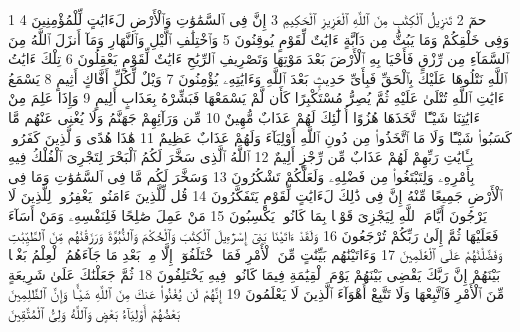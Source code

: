 {\tiny\colorbox{cl_aya}{1}} حمٓ
{\tiny\colorbox{cl_aya}{2}} تَنزِيلُ ٱلْكِتَٰبِ مِنَ ٱللَّهِ ٱلْعَزِيزِ ٱلْحَكِيمِ
{\tiny\colorbox{cl_aya}{3}} إِنَّ فِى ٱلسَّمَٰوَٰتِ وَٱلْأَرْضِ لَءَايَٰتٍ لِّلْمُؤْمِنِينَ
{\tiny\colorbox{cl_aya}{4}} وَفِى خَلْقِكُمْ وَمَا يَبُثُّ مِن دَآبَّةٍ ءَايَٰتٌ لِّقَوْمٍ يُوقِنُونَ
{\tiny\colorbox{cl_aya}{5}} وَٱخْتِلَٰفِ ٱلَّيْلِ وَٱلنَّهَارِ وَمَآ أَنزَلَ ٱللَّهُ مِنَ ٱلسَّمَآءِ مِن رِّزْقٍ فَأَحْيَا بِهِ ٱلْأَرْضَ بَعْدَ مَوْتِهَا وَتَصْرِيفِ ٱلرِّيَٰحِ ءَايَٰتٌ لِّقَوْمٍ يَعْقِلُونَ
{\tiny\colorbox{cl_aya}{6}} تِلْكَ ءَايَٰتُ ٱللَّهِ نَتْلُوهَا عَلَيْكَ بِٱلْحَقِّ فَبِأَىِّ حَدِيثٍۭ بَعْدَ ٱللَّهِ وَءَايَٰتِهِۦ يُؤْمِنُونَ
{\tiny\colorbox{cl_aya}{7}} وَيْلٌ لِّكُلِّ أَفَّاكٍ أَثِيمٍ
{\tiny\colorbox{cl_aya}{8}} يَسْمَعُ ءَايَٰتِ ٱللَّهِ تُتْلَىٰ عَلَيْهِ ثُمَّ يُصِرُّ مُسْتَكْبِرًا كَأَن لَّمْ يَسْمَعْهَا فَبَشِّرْهُ بِعَذَابٍ أَلِيمٍ
{\tiny\colorbox{cl_aya}{9}} وَإِذَا عَلِمَ مِنْ ءَايَٰتِنَا شَيْـًٔا ٱتَّخَذَهَا هُزُوًا أُو۟لَٰٓئِكَ لَهُمْ عَذَابٌ مُّهِينٌ
{\tiny\colorbox{cl_aya}{10}} مِّن وَرَآئِهِمْ جَهَنَّمُ وَلَا يُغْنِى عَنْهُم مَّا كَسَبُوا۟ شَيْـًٔا وَلَا مَا ٱتَّخَذُوا۟ مِن دُونِ ٱللَّهِ أَوْلِيَآءَ وَلَهُمْ عَذَابٌ عَظِيمٌ
{\tiny\colorbox{cl_aya}{11}} هَٰذَا هُدًى وَٱلَّذِينَ كَفَرُوا۟ بِـَٔايَٰتِ رَبِّهِمْ لَهُمْ عَذَابٌ مِّن رِّجْزٍ أَلِيمٌ
{\tiny\colorbox{cl_aya}{12}} ٱللَّهُ ٱلَّذِى سَخَّرَ لَكُمُ ٱلْبَحْرَ لِتَجْرِىَ ٱلْفُلْكُ فِيهِ بِأَمْرِهِۦ وَلِتَبْتَغُوا۟ مِن فَضْلِهِۦ وَلَعَلَّكُمْ تَشْكُرُونَ
{\tiny\colorbox{cl_aya}{13}} وَسَخَّرَ لَكُم مَّا فِى ٱلسَّمَٰوَٰتِ وَمَا فِى ٱلْأَرْضِ جَمِيعًا مِّنْهُ إِنَّ فِى ذَٰلِكَ لَءَايَٰتٍ لِّقَوْمٍ يَتَفَكَّرُونَ
{\tiny\colorbox{cl_aya}{14}} قُل لِّلَّذِينَ ءَامَنُوا۟ يَغْفِرُوا۟ لِلَّذِينَ لَا يَرْجُونَ أَيَّامَ ٱللَّهِ لِيَجْزِىَ قَوْمًۢا بِمَا كَانُوا۟ يَكْسِبُونَ
{\tiny\colorbox{cl_aya}{15}} مَنْ عَمِلَ صَٰلِحًا فَلِنَفْسِهِۦ وَمَنْ أَسَآءَ فَعَلَيْهَا ثُمَّ إِلَىٰ رَبِّكُمْ تُرْجَعُونَ
{\tiny\colorbox{cl_aya}{16}} وَلَقَدْ ءَاتَيْنَا بَنِىٓ إِسْرَٰٓءِيلَ ٱلْكِتَٰبَ وَٱلْحُكْمَ وَٱلنُّبُوَّةَ وَرَزَقْنَٰهُم مِّنَ ٱلطَّيِّبَٰتِ وَفَضَّلْنَٰهُمْ عَلَى ٱلْعَٰلَمِينَ
{\tiny\colorbox{cl_aya}{17}} وَءَاتَيْنَٰهُم بَيِّنَٰتٍ مِّنَ ٱلْأَمْرِ فَمَا ٱخْتَلَفُوٓا۟ إِلَّا مِنۢ بَعْدِ مَا جَآءَهُمُ ٱلْعِلْمُ بَغْيًۢا بَيْنَهُمْ إِنَّ رَبَّكَ يَقْضِى بَيْنَهُمْ يَوْمَ ٱلْقِيَٰمَةِ فِيمَا كَانُوا۟ فِيهِ يَخْتَلِفُونَ
{\tiny\colorbox{cl_aya}{18}} ثُمَّ جَعَلْنَٰكَ عَلَىٰ شَرِيعَةٍ مِّنَ ٱلْأَمْرِ فَٱتَّبِعْهَا وَلَا تَتَّبِعْ أَهْوَآءَ ٱلَّذِينَ لَا يَعْلَمُونَ
{\tiny\colorbox{cl_aya}{19}} إِنَّهُمْ لَن يُغْنُوا۟ عَنكَ مِنَ ٱللَّهِ شَيْـًٔا وَإِنَّ ٱلظَّٰلِمِينَ بَعْضُهُمْ أَوْلِيَآءُ بَعْضٍ وَٱللَّهُ وَلِىُّ ٱلْمُتَّقِينَ
